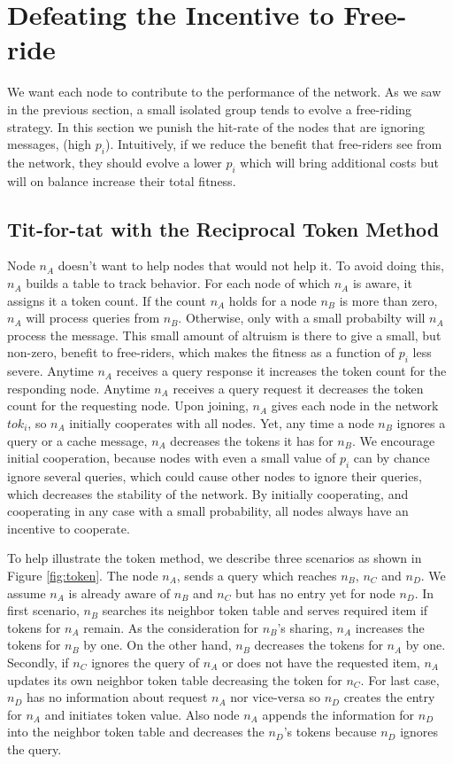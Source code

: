 \documentclass[12pt,journal,draftcls,letterpaper,onecolumn]{IEEEtran}
\begin{document}
\section{Defeating the Incentive to Free-ride}\label{sec:countermeasure}
We want each node to contribute to the performance of the network.  As we saw
in the previous section, a small isolated group tends to evolve a free-riding
strategy.
In this section we punish the hit-rate of the nodes that are ignoring
messages, (high $p_i$).
Intuitively, if we reduce the benefit that free-riders see from the network,
they should evolve a lower $p_i$ which will bring additional costs but will
on balance increase their total fitness.

\subsection{Tit-for-tat with the Reciprocal Token Method}
Node $n_A$ doesn't want to help nodes that would not help it.  To avoid doing
this, $n_A$ builds a table to track behavior.  For each node of which $n_A$ is
aware, it assigns it a token count.  If the count $n_A$ holds for a node $n_B$
is more than zero, $n_A$ will process queries from $n_B$.  Otherwise, only
with a small probabilty will $n_A$ process the message.  This small amount of
altruism is there to give a small, but non-zero, benefit to free-riders, which
makes the fitness as a function of $p_i$ less severe. 
Anytime $n_A$ receives a query response it increases the token count for the
responding node.  Anytime $n_A$ receives a query request it decreases the
token count for the requesting node.
Upon joining, $n_A$
gives each node in the network $tok_i$, so $n_A$ initially cooperates with all
nodes.  Yet, any time a node $n_B$ ignores
a query or a cache message, $n_A$ decreases the tokens it has for $n_B$.  We
encourage initial cooperation, because nodes with even a small value of $p_i$
can by chance ignore several queries, which could cause other nodes to ignore
their queries, which decreases the stability of the network.  By initially
cooperating, and cooperating in any case with a small probability, all nodes
always have an incentive to cooperate.

To help illustrate the token method, we describe three
scenarios as shown in Figure \ref{fig:token}.
The node $n_A$, sends a query which reaches $n_B$, $n_C$ and
$n_D$.  We assume $n_A$ is already aware of $n_B$ and $n_C$ but has no entry
yet for node $n_D$.  In first scenario, $n_B$ searches its neighbor token
table and serves required item if tokens for $n_A$ remain. As the consideration for $n_B$'s sharing,
$n_A$ increases the tokens for $n_B$ by one. On the other hand, $n_B$ decreases the tokens for $n_A$ by
one. Secondly, if $n_C$ ignores the query of $n_A$ or does not have the requested item, $n_A$ updates its
own neighbor token table decreasing the token for $n_C$. For last case, $n_D$
has no information about request $n_A$ nor vice-versa so $n_D$ creates the
entry for $n_A$ and initiates token value. Also node $n_A$
appends the information for $n_D$ into the neighbor token table and decreases the $n_D$'s tokens
because $n_D$ ignores the query.
\end{document}
